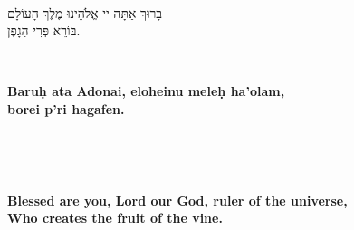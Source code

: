 \documentclass[letter,11pt,openany]{memoir}
\newcommand{\HgEllipsis}{\ensuremath{\left[\ldots\right]}}
\newcommand{\HgSource}[1]{\hfill{\small---\itshape{#1}}}
\newcommand{\HgHL}[1]{{\Large\textbf{#1}\par
\noindent\\[-.5em]}}
\newenvironment{HgEnglish}{\strut\\
\noindent}{\vspace{1em}}
\newenvironment{HgTranslit}{\strut\\
\noindent
\begin{itshape}
	}{
\end{itshape}
\vspace{1em}}
\newenvironment{HgHebrew}{
\begin{hebrew}
	\strut\\
	\noindent\LARGE}{
\end{hebrew}
}
\begin{document}
\begin{HgHebrew}
	בָּרוּךְ אַתָּה יי אֱלֹהֵינוּ מֶלֶךְ הָעוֹלָם \\
	בּוֹרֵא פְּרִי הַגָפֶן.
	
\end{HgHebrew}
\begin{HgTranslit}
	\HgHL{Baru\d{h} ata Adonai, eloheinu mele\d{h} ha'olam, \\
	borei p'ri hagafen.}
	
\end{HgTranslit}
\vspace{-1em} 
\begin{HgEnglish}
	\HgHL{Blessed are you, Lord our God, ruler of the universe, \\
	Who creates the fruit of the vine.}
	
\end{HgEnglish}
\end{document}

